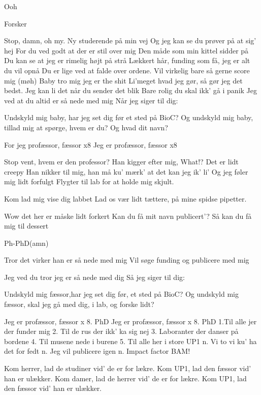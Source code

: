 \documentclass[a4paper,11pt]{article}
\begin{document}
\begin{song}
 Ooh

Forsker

Stop, damn, oh my.
Ny studerende på min vej
Og jeg kan se du prøver på at sig’ hej
For du ved godt at der er stil over mig
Den måde som min kittel sidder på
Du kan se at jeg er rimelig højt på strå
Lækkert hår, funding som få, jeg er alt du vil opnå
Du er lige ved at falde over ordene.
Vil virkelig bare så gerne score mig (møh)
Baby tro mig jeg er the shit
Li'meget hvad jeg gør, så gør jeg det bedst.
Jeg kan li det når du sender det blik
Bare rolig du skal ikk’ gå i panik
Jeg ved at du altid er så nede med mig 
Når jeg siger til dig:


Undskyld mig baby, har jeg set dig før et sted på BioC?
Og undskyld mig baby, tillad mig at spørge, hvem er du? Og hvad dit navn?


For jeg profæssor, fæssor x8
Jeg er profæssor, fæssor x8

 Stop vent, hvem er den professor?
Han kigger efter mig, What!?
Det er lidt creepy
Han nikker til mig, han må ku’ mærk' at det kan jeg ik’ li’
Og jeg føler mig lidt forfulgt
Flygter til lab for at holde mig skjult.

 Kom lad mig vise dig labbet
Lad os vær lidt tættere, på mine spidse pipetter.

 Wow det her er måske lidt forkert
Kan du få mit navn publicert’?
Så kan du få mig til dessert

 Ph-PhD(amn)

 Tror det virker han er så nede med mig
Vil søge funding og publicere med mig

Jeg ved du tror jeg er så nede med dig
Så jeg siger til dig:

Undskyld mig fæssor,har jeg set dig før, et sted på BioC?
Og undskyld mig fæssor, skal jeg gå med dig, i lab, og forske lidt?

 Jeg er profæssor, fæssor x 8. 
 PhD
 Jeg er profæssor, fæssor x 8. 
 PhD
1.Til alle jer der funder mig
2. Til de rus der ikk’ ka sig nej
3. Laboranter der danser på bordene
4. Til musene nede i burene
5. Til alle her i store UP1
n. Vi to vi ku’ ha det for fedt
n. Jeg vil publicere igen
n. Impact factor BAM!

 Kom herrer, lad de studiner vid' de er for lækre.
 Kom UP1, lad den fæssor vid' han er ulækker.
 Kom damer, lad de herrer vid' de er for lækre.
 Kom UP1, lad den fæssor vid' han er ulækker.


\end{song}
\end{document}
